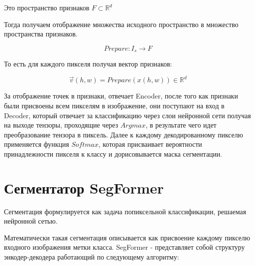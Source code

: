 \documentclass[areasetadvanced]{scrartcl}
\begin{document}
Это пространство признаков $F \subset \mathbb{R}^d$

Тогда получаем отображение множества исходного пространство в множество пространства признаков. 

$$
    Prepare : I_s \rightarrow F
$$

То есть для каждого пикселя получая вектор признаков:

$$
    \vec{v}(h,w) = Prepare(x(h,w)) \in \mathbb{R}^d
$$

За отображение точек в признаки, отвечает Encoder, после того как признаки были присвоены всем пикселям в изображение,
они поступают на вход в Decoder, который отвечает за классификацию через слои нейронной сети получая на выходе тензоры, проходящие через $Argmax$, в результате чего идет преобразование тензора в пиксель. Далее к каждому декодированному пикселю применяется функция $Softmax$, которая 
присваивает вероятности принадлежности пикселя к классу и дорисовывается маска сегментации.

\newpage
\section{Сегментатор SegFormer}
Сегментация формулируется как задача попиксельной классификации, решаемая нейронной сетью.

Математически такая сегментация описывается как присвоение каждому пикселю входного изображения метки класса.
SegFormer - представляет собой структуру энкодер-декодера работающий по следующему алгоритму:
\end{document}
